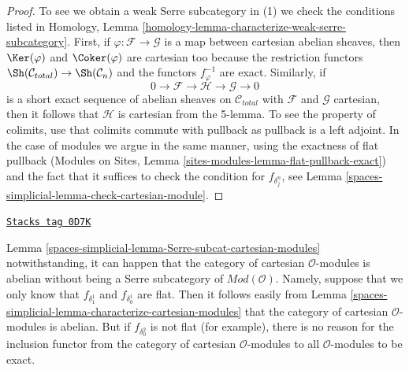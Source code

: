 \begin{proof}
To see we obtain a weak Serre subcategory in (1)
we check the conditions listed in
Homology, Lemma \ref{homology-lemma-characterize-weak-serre-subcategory}.
First, if $\varphi : \mathcal{F} \to \mathcal{G}$ is a map
between cartesian abelian sheaves, then
$\Ker(\varphi)$ and $\Coker(\varphi)$ are cartesian too
because the restriction functors
$\Sh(\mathcal{C}_{total}) \to \Sh(\mathcal{C}_n)$
and the functors $f_\varphi^{-1}$ are exact.
Similarly, if
$$
0 \to \mathcal{F} \to \mathcal{H} \to \mathcal{G} \to 0
$$
is a short exact sequence of abelian sheaves on $\mathcal{C}_{total}$
with $\mathcal{F}$ and $\mathcal{G}$ cartesian, then it follows that
$\mathcal{H}$ is cartesian from the 5-lemma. To see the property of
colimits, use that colimits commute with pullback as pullback is a
left adjoint. In the case of modules
we argue in the same manner, using the exactness of flat pullback
(Modules on Sites, Lemma \ref{sites-modules-lemma-flat-pullback-exact})
and the fact that it suffices to check the condition
for $f_{\delta^n_j}$, see Lemma \ref{spaces-simplicial-lemma-check-cartesian-module}.
\end{proof}

\begin{remark}[Warning]

\label{spaces-simplicial-remark-warning-cartesian-modules}
\href{https://stacks.math.columbia.edu/tag/0D7K}{\texttt{Stacks tag 0D7K}}

Lemma \ref{spaces-simplicial-lemma-Serre-subcat-cartesian-modules} notwithstanding, it
can happen that the category of cartesian $\mathcal{O}$-modules is
abelian without being a Serre subcategory of $\textit{Mod}(\mathcal{O})$.
Namely, suppose that we only know that
$f_{\delta_1^1}$ and $f_{\delta_0^1}$ are flat.
Then it follows easily from
Lemma \ref{spaces-simplicial-lemma-characterize-cartesian-modules}
that the category of cartesian $\mathcal{O}$-modules is abelian.
But if $f_{\delta_0^2}$ is not flat (for example),
there is no reason for the inclusion functor
from the category of cartesian $\mathcal{O}$-modules
to all $\mathcal{O}$-modules to be exact.
\end{remark}


